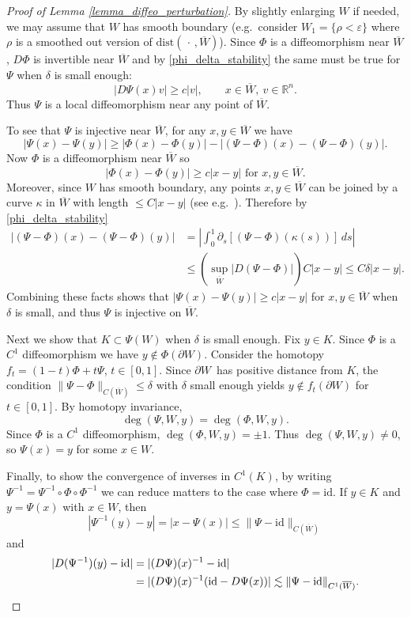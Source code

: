 \documentclass[11pt,letterpaper]{amsart}
\theoremstyle{definition}
\numberwithin{equation}{section}
\newcommand{\mR}{\mathbb{R}}                    %
\newcommand{\norm}[1]{\lVert #1 \rVert}         %
\newcommand{\ol}[1]{\overline{#1}}
\newcommand{\id}{\mathrm{id}}
\newcommand{\eps}{\varepsilon}
\newcommand{\p}{\partial}
\def\p{\partial}
\begin{document}
\begin{proof}[Proof of Lemma \ref{lemma_diffeo_perturbation}]
By slightly enlarging $W$ if needed, we may assume that $W$ has smooth boundary (e.g.\ consider $W_1 = \{ \rho < \eps \}$ where $\rho$ is a smoothed out version of $\mathrm{dist}(\,\cdot\,, \ol{W})$). Since $\Phi$ is a diffeomorphism near $\ol{W}$, $D \Phi$ is invertible near $\ol{W}$ and by \eqref{phi_delta_stability} the same must be true for $\Psi$ when $\delta$ is small enough:
\[ %
|D\Psi(x)v| \geq c |v|, \qquad x \in \ol{W}, \ v \in \mR^n.
\] %
Thus $\Psi$ is a local diffeomorphism near any point of $\ol{W}$.

To see that $\Psi$ is injective near $\ol{W}$, for any $x,y \in \ol{W}$ we have 
\[
|\Psi(x)-\Psi(y)| \geq |\Phi(x)-\Phi(y)| - |(\Psi-\Phi)(x) - (\Psi-\Phi)(y)|.
\]
Now $\Phi$ is a diffeomorphism near $\ol{W}$ so 
\[
|\Phi(x)-\Phi(y)| \geq c|x-y| \text{ for $x,y \in \ol{W}$.}
\]
Moreover, since $W$ has smooth boundary, any points $x,y \in \ol{W}$ can be joined by a curve $\kappa$ in $\ol{W}$ with length $\leq C|x-y|$ (see e.g.\ \cite[(2.132)]{BrudnyiBrudnyi2012}). Therefore by \eqref{phi_delta_stability}
\begin{align*}
|(\Psi-\Phi)(x) - (\Psi-\Phi)(y)| &= \left| \int_0^1 \p_s \left[ (\Psi-\Phi)(\kappa(s)) \right] \,ds \right| \\
 &\leq (\sup_{\ol{W}} |D(\Psi-\Phi)|) C |x-y| \leq C \delta |x-y|.
\end{align*}
Combining these facts shows that $|\Psi(x)-\Psi(y)| \geq c|x-y|$ for $x,y \in \ol{W}$ when $\delta$ is small, and thus $\Psi$ is injective on $\ol{W}$.

Next we show that $K \subset \Psi(W)$ when $\delta$ is small enough. Fix $y \in K$. Since $\Phi$ is a $C^1$ diffeomorphism we have $y \notin \Phi(\p W)$. Consider the homotopy $f_t = (1-t)\Phi + t \Psi$, $t \in [0,1]$. Since $\p W$ has positive distance from $K$, the condition $\norm{\Psi - \Phi}_{C(\ol{W})} \leq \delta$ with $\delta$ small enough yields $y \notin f_t(\p W)$ for $t \in [0,1]$. By homotopy invariance,
\[
\deg(\Psi, W, y)
= \deg(\Phi, W, y).
\]
Since $\Phi$ is a $C^1$ diffeomorphism, $\deg(\Phi, W, y) = \pm 1$. Thus $\deg(\Psi, W, y) \neq 0$, so $\Psi(x) = y$ for some $x \in W$.

Finally, to show the convergence of inverses in $C^1(K)$, by writing $\Psi^{-1} = \Psi^{-1} \circ \Phi \circ \Phi^{-1}$ we can reduce matters to the case where $\Phi = \id$. If $y \in K$ and $y = \Psi(x)$ with $x \in W$, then 
\[
|\Psi^{-1}(y) - y| = |x - \Psi(x)| \leq \norm{\Psi-\id}_{C(\ol{W})}
\]
and 
\begin{align*}
|D(\Psi^{-1})(y) - \id| &= |(D\Psi)(x)^{-1} - \id| \\
 &= |(D\Psi)(x)^{-1}(\id - D\Psi(x))| \lesssim \norm{\Psi-\id}_{C^1(\ol{W})}. \qedhere
\end{align*}
\end{proof}
\end{document}

